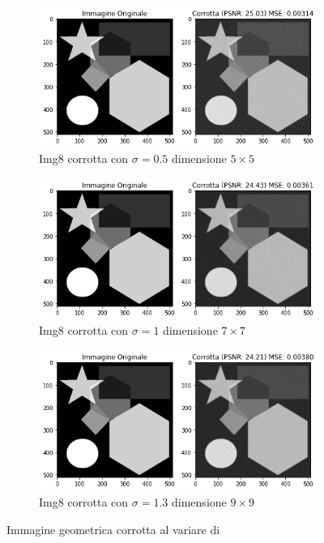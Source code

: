 \begin{figure}[H]
    \centering
    \begin{subfigure}{0.6\textwidth}
        \centering
        \includegraphics[width=\textwidth]{imgRel/img8corrotto/img8corrotta5x5.png}
        \caption{Img8 corrotta con $\sigma = 0.5$ dimensione $5 \times 5$}
        \label{fig: 8corrotto5}
    \end{subfigure}
    \begin{subfigure}{0.6\textwidth}
        \centering
        \includegraphics[width=\textwidth]{imgRel/img8corrotto/img8corrotta7x7.png}
        \caption{Img8 corrotta con $\sigma = 1$ dimensione $7\times 7$}
        \label{fig: 8corrotto7}
    \end{subfigure}
    \begin{subfigure}{0.6\textwidth}
        \centering
        \includegraphics[width=\textwidth]{imgRel/img8corrotto/img8corrotta9x9.png}
        \caption{Img8 corrotta con $\sigma = 1.3$ dimensione $9 \times 9$}
        \label{fig: 8corrotto9}
    \end{subfigure}
    \caption{Immagine geometrica corrotta al variare di }
    \label{fig: 8corrotto}
\end{figure}
